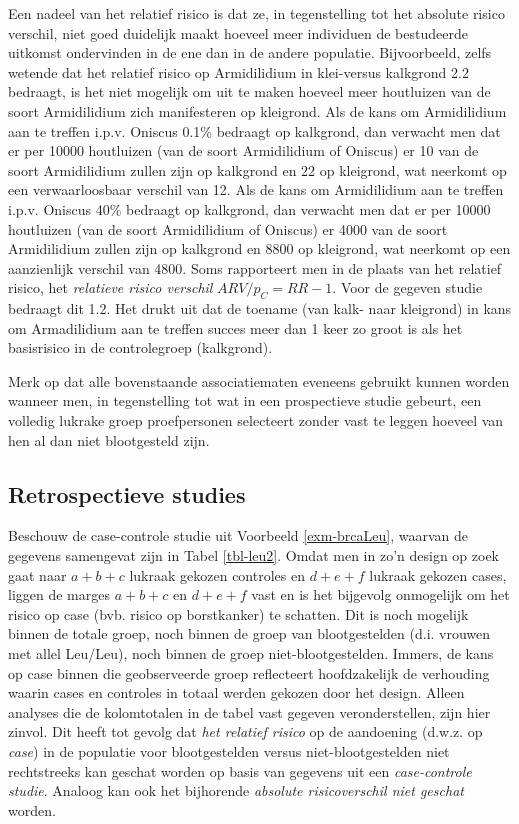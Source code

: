 \documentclass[
  dutch,
  letterpaper,
  12pt]{book}
\theoremstyle{definition}
\theoremstyle{definition}
\theoremstyle{definition}
\theoremstyle{remark}
\begin{document}
Een nadeel van het relatief risico is dat ze, in tegenstelling tot het
absolute risico verschil, niet goed duidelijk maakt hoeveel meer
individuen de bestudeerde uitkomst ondervinden in de ene dan in de
andere populatie. Bijvoorbeeld, zelfs wetende dat het relatief risico op
Armidilidium in klei-versus kalkgrond 2.2 bedraagt, is het niet mogelijk
om uit te maken hoeveel meer houtluizen van de soort Armidilidium zich
manifesteren op kleigrond. Als de kans om Armidilidium aan te treffen
i.p.v. Oniscus 0.1\% bedraagt op kalkgrond, dan verwacht men dat er per
10000 houtluizen (van de soort Armidilidium of Oniscus) er 10 van de
soort Armidilidium zullen zijn op kalkgrond en 22 op kleigrond, wat
neerkomt op een verwaarloosbaar verschil van 12. Als de kans om
Armidilidium aan te treffen i.p.v. Oniscus 40\% bedraagt op kalkgrond,
dan verwacht men dat er per 10000 houtluizen (van de soort Armidilidium
of Oniscus) er 4000 van de soort Armidilidium zullen zijn op kalkgrond
en 8800 op kleigrond, wat neerkomt op een aanzienlijk verschil van 4800.
Soms rapporteert men in de plaats van het relatief risico, het
\emph{relatieve risico verschil} \(ARV/p_C=RR-1\). Voor de gegeven
studie bedraagt dit 1.2. Het drukt uit dat de toename (van kalk- naar
kleigrond) in kans om Armadilidium aan te treffen succes meer dan 1 keer
zo groot is als het basisrisico in de controlegroep (kalkgrond).

Merk op dat alle bovenstaande associatiematen eveneens gebruikt kunnen
worden wanneer men, in tegenstelling tot wat in een prospectieve studie
gebeurt, een volledig lukrake groep proefpersonen selecteert zonder vast
te leggen hoeveel van hen al dan niet blootgesteld zijn.

\subsection{Retrospectieve studies}\label{sec-retrospect}

Beschouw de case-controle studie uit Voorbeeld \ref{exm-brcaLeu},
waarvan de gegevens samengevat zijn in Tabel \ref{tbl-leu2}. Omdat men
in zo'n design op zoek gaat naar \(a+b+c\) lukraak gekozen controles en
\(d+e+f\) lukraak gekozen cases, liggen de marges \(a+b+c\) en \(d+e+f\)
vast en is het bijgevolg onmogelijk om het risico op case (bvb. risico
op borstkanker) te schatten. Dit is noch mogelijk binnen de totale
groep, noch binnen de groep van blootgestelden (d.i. vrouwen met allel
Leu/Leu), noch binnen de groep niet-blootgestelden. Immers, de kans op
case binnen die geobserveerde groep reflecteert hoofdzakelijk de
verhouding waarin cases en controles in totaal werden gekozen door het
design. Alleen analyses die de kolomtotalen in de tabel vast gegeven
veronderstellen, zijn hier zinvol. Dit heeft tot gevolg dat \emph{het
relatief risico} op de aandoening (d.w.z. op \emph{case}) in de
populatie voor blootgestelden versus niet-blootgestelden niet
rechtstreeks kan geschat worden op basis van gegevens uit een
\emph{case-controle studie}. Analoog kan ook het bijhorende
\emph{absolute risicoverschil niet geschat} worden.
\end{document}
